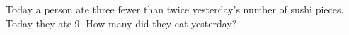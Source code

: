 Today a person ate three fewer than twice yesterday's number of sushi pieces. Today they ate 9. How many did they eat yesterday?
